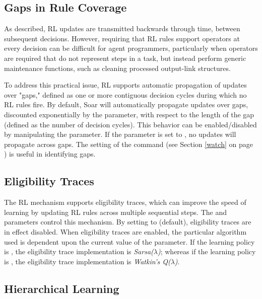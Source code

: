 \subsection{Gaps in Rule Coverage}
\label{RL-gaps}

As described, RL updates are transmitted backwards through time, between subsequent decisions. However, requiring that RL rules support operators at every decision can be difficult for agent programmers, particularly when operators are required that do not represent steps in a task, but instead perform generic maintenance functions, such as cleaning processed output-link structures.

To address this practical issue, RL supports automatic propagation of updates over "gaps," defined as one or more contiguous decision cycles during which no RL rules fire. By default, Soar will automatically propagate updates over gaps, discounted exponentially by the  parameter, with respect to the length of the gap (defined as the number of decision cycles). This behavior can be enabled/disabled by manipulating the  parameter. If the  parameter is set to , no updates will propagate across gaps. The  setting of the  command (see Section \ref{watch} on page \pageref{watch}) is useful in identifying gaps.

\subsection{Eligibility Traces}
\label{RL-et}
The RL mechanism supports eligibility traces, which can improve the speed of learning by updating RL rules across multiple sequential steps. The  and  parameters control this mechanism. By setting  to  (default), eligibility traces are in effect disabled. When eligibility traces are enabled, the particular algorithm used is dependent upon the current value of the  parameter. If the learning policy is , the eligibility trace implementation is \emph{Sarsa($\lambda$)}; whereas if the learning policy is , the eligibility trace implementation is \emph{Watkin's Q($\lambda$)}.

\subsection{Hierarchical Learning}
\label{RL-hrl}

